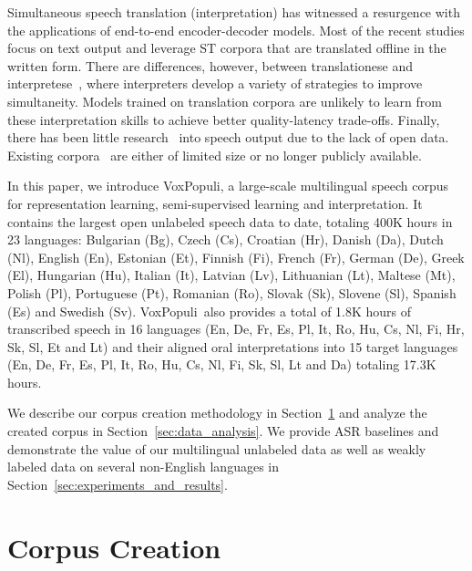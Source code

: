 \documentclass[11pt,a4paper]{article}
\newcommand{\todo}[1]{\noindent{\textbf{\color{red} #1}}}
\newcommand{\vp}{VoxPopuli}
\begin{document}

Simultaneous speech translation (interpretation) has witnessed a resurgence with the applications of end-to-end encoder-decoder models. Most of the recent studies focus on text output and leverage ST corpora that are translated offline in the written form. There are differences, however, between translationese and interpretese~\citep{sridhar2013corpus,he2016interpretese}, where interpreters develop a variety of strategies to improve simultaneity. Models trained on translation corpora are unlikely to learn from these interpretation skills to achieve better quality-latency trade-offs. Finally, there has been little research~\citep{translatotron,tjandra2019speech,zhang2020uwspeech} into speech output due to the lack of open data. Existing corpora~\citep{tohyama2004ciair,bendazzoli2005approach} are either of limited size or no longer publicly available.

In this paper, we introduce \vp, a large-scale multilingual speech corpus for representation learning, semi-supervised learning and interpretation. It contains the largest open unlabeled speech data to date, totaling 400K hours in 23 languages: Bulgarian (Bg), Czech (Cs), Croatian (Hr), Danish (Da), Dutch (Nl), English (En), Estonian (Et), Finnish (Fi), French (Fr), German (De), Greek (El), Hungarian (Hu), Italian (It), Latvian (Lv), Lithuanian (Lt), Maltese (Mt), Polish (Pl), Portuguese (Pt), Romanian (Ro), Slovak (Sk), Slovene (Sl), Spanish (Es) and Swedish (Sv). \vp~also provides a total of 1.8K hours of transcribed speech in 16 languages (En, De, Fr, Es, Pl, It, Ro, Hu, Cs, Nl, Fi, Hr, Sk, Sl, Et and Lt) and their aligned oral interpretations into 15 target languages (En, De, Fr, Es, Pl, It, Ro, Hu, Cs, Nl, Fi, Sk, Sl, Lt and Da) totaling 17.3K hours.

We describe our corpus creation methodology in Section~\ref{sec:corpus_creation} and analyze the created corpus in Section~\ref{sec:data_analysis}. We provide ASR baselines and demonstrate the value of our multilingual unlabeled data as well as weakly labeled data on several non-English languages in Section~\ref{sec:experiments_and_results}.

\section{Corpus Creation}
\label{sec:corpus_creation}
\end{document}
